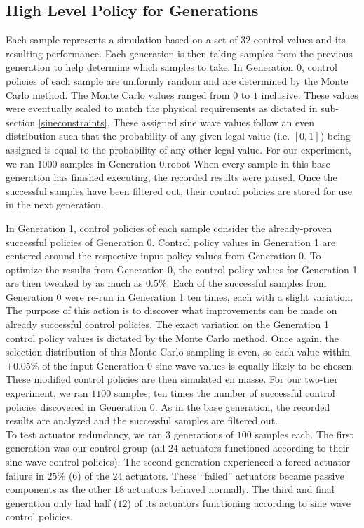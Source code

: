 \documentclass{llncs}
\begin{document}
\subsection{High Level Policy for Generations}
\label{highlevelpolicy} {
Each sample represents a simulation based on a set of $32$ control values and its resulting performance. 
Each generation is then taking samples from the previous generation to help determine which samples to take. 
In Generation 0, control policies of each sample are uniformly random and are determined by the Monte Carlo method.
The Monte Carlo values ranged from $0$ to $1$ inclusive. 
These values were eventually scaled to match the physical requirements as dictated in sub-section \ref{sineconstraints}.
These assigned sine wave values follow an even distribution such that the probability of any given legal value (i.e. $[0,1]$) being assigned is equal to the probability of any other legal value.
For our experiment, we ran $1000$ samples in Generation 0.robot
When every sample in this base generation has finished executing, the recorded results were parsed.
Once the successful samples have been filtered out, their control policies are stored for use in the next generation.

In Generation 1, control policies of each sample consider the already-proven successful policies of Generation 0.
Control policy values in Generation 1 are centered around the respective input policy values from Generation 0.
To optimize the results from Generation 0, the control policy values for Generation 1 are then tweaked by as much as $0.5\%$.
Each of the successful samples from Generation 0 were re-run in Generation 1 ten times, each with a slight variation.
The purpose of this action is to discover what improvements can be made on already successful control policies.
The exact variation on the Generation 1 control policy values is dictated by the Monte Carlo method.
Once again, the selection distribution of this Monte Carlo sampling is even, so each value within $\pm0.05\%$ of the input Generation 0 sine wave values is equally likely to be chosen.
These modified control policies are then simulated en masse.
For our two-tier experiment, we ran $1100$ samples, ten times the number of successful control policies discovered in Generation 0.
As in the base generation, the recorded results are analyzed and the successful samples are filtered out. \\

To test actuator redundancy, we ran $3$ generations of $100$ samples each.
The first generation was our control group (all $24$ actuators functioned according to their sine wave control policies).
The second generation experienced a forced actuator failure in $25\%$ ($6$) of the $24$ actuators.
These ``failed'' actuators became passive components as the other $18$ actuators behaved normally.
The third and final generation only had half ($12$) of its actuators functioning according to sine wave control policies.
}
\end{document}
